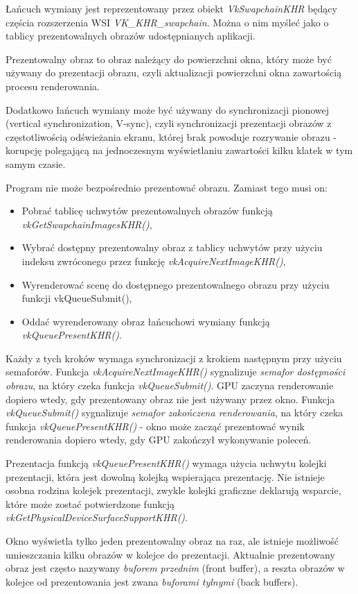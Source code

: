 Łańcuch wymiany jest reprezentowany przez obiekt \textit{VkSwapchainKHR} będący częścia rozszerzenia WSI \textit{VK\_KHR\_swapchain}. Można o nim myśleć jako o tablicy prezentowalnych obrazów udostępnianych aplikacji.

Prezentowalny obraz to obraz należący do powierzchni okna, który może być używany do prezentacji obrazu, czyli aktualizacji powierzchni okna zawartością procesu renderowania.

Dodatkowo łańcuch wymiany może być używany do synchronizacji pionowej (vertical synchronization, V-sync), czyli synchronizacji prezentacji obrazów z częstotliwością
odświeżania ekranu, której brak powoduje rozrywanie obrazu - korupcję polegającą na jednoczesnym wyświetlaniu zawartości
kilku klatek w tym samym czasie.

Program nie może bezpośrednio prezentować obrazu. Zamiast tego musi on:
\begin{itemize}
	\item Pobrać tablicę uchwytów prezentowalnych obrazów funkcją \textit{vkGetSwapchainImagesKHR()},
	\item Wybrać dostępny prezentowalny obraz z tablicy uchwytów przy użyciu indeksu zwróconego przez funkcję \textit{vkAcquireNextImageKHR()},
	\item Wyrenderować scenę do dostępnego prezentowalnego obrazu przy użyciu funkcji vkQueueSubmit(),
	\item Oddać wyrenderowany obraz łańcuchowi wymiany funkcją \textit{vkQueuePresentKHR()}.
\end{itemize}
Każdy z tych kroków wymaga synchronizacji z krokiem następnym przy użyciu semaforów. Funkcja \textit{vkAcquireNextImageKHR()} sygnalizuje \textit{semafor dostępności obrazu}, na który czeka funkcja \textit{vkQueueSubmit()}. GPU zaczyna renderowanie dopiero wtedy, gdy prezentowany obraz nie jest używany przez okno.
Funkcja \textit{vkQueueSubmit()} sygnalizuje \textit{semafor zakończena renderowania}, na który czeka funkcja \textit{vkQueuePresentKHR()} - okno może zacząć prezentować wynik renderowania dopiero wtedy, gdy GPU zakończył wykonywanie poleceń.

Prezentacja funkcją \textit{vkQueuePresentKHR()} wymaga użycia uchwytu kolejki prezentacji, która jest dowolną kolejką wspierająca prezentację.
Nie istnieje osobna rodzina kolejek prezentacji, zwykle kolejki graficzne deklarują wsparcie, które może zostać potwierdzone funkcją \textit{vkGetPhysicalDeviceSurfaceSupportKHR()}.

Okno wyświetla tylko jeden prezentowalny obraz na raz, ale istnieje możliwość umieszczania kilku obrazów w kolejce do
prezentacji. Aktualnie prezentowany obraz jest często nazywany \textit{buforem przednim} (front buffer), a reszta obrazów w kolejce od prezentowania jest zwana \textit{buforami tylnymi} (back buffers).

